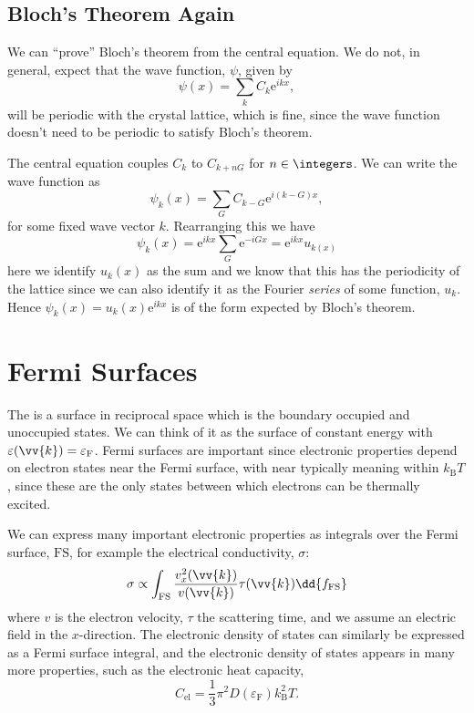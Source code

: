 \documentclass[fleqn]{NotesClass}
\newcommand*{\boltzmann}{k_{\mathrm{B}}}
\newcommand*{\e}{\mathrm{e}}
\newcommand*{\fermi}{\mathrm{F}}
\begin{document}
    \subsection{Bloch's Theorem Again}
    We can \enquote{prove} Bloch's theorem from the central equation.
    We do not, in general, expect that the wave function, \(\psi\), given by
    \begin{equation}
        \psi(x) = \sum_k C_k\e^{ikx},
    \end{equation}
    will be periodic with the crystal lattice, which is fine, since the wave function doesn't need to be periodic to satisfy Bloch's theorem.
    
    The central equation couples \(C_k\) to \(C_{k + nG}\) for \(n \in \integers\).
    We can write the wave function as
    \begin{equation}
        \psi_k(x) = \sum_G C_{k-G}\e^{i(k-G)x},
    \end{equation}
    for some fixed wave vector \(k\).
    Rearranging this we have
    \begin{equation}
        \psi_k(x) = \e^{ikx} \sum_G \e^{-i G x} = \e^{ikx}u_{k(x)}
    \end{equation}
    here we identify \(u_{k}(x)\) as the sum and we know that this has the periodicity of the lattice since we can also identify it as the Fourier \emph{series} of some function, \(u_k\).
    Hence \(\psi_k(x) = u_k(x)\e^{ikx}\) is of the form expected by Bloch's theorem.
    
    \section{Fermi Surfaces}
    The  is a surface in reciprocal space which is the boundary occupied and unoccupied states.
    We can think of it as the surface of constant energy with \(\varepsilon(\vv{k}) = \varepsilon_{\fermi}\).
    Fermi surfaces are important since electronic properties depend on electron states near the Fermi surface, with near typically meaning within \(\boltzmann T\), since these are the only states between which electrons can be thermally excited.
    
    We can express many important electronic properties as integrals over the Fermi surface, \(\mathrm{FS}\), for example the electrical conductivity, \(\sigma\):
    \begin{equation}
        \sigma \propto \int_{\mathrm{FS}} \frac{v_x^2(\vv{k})}{v(\vv{k})}\tau(\vv{k}) \dd{f_{\mathrm{FS}}}
    \end{equation}
    where \(v\) is the electron velocity, \(\tau\) the scattering time, and we assume an electric field in the \(x\)-direction.
    The electronic density of states can similarly be expressed as a Fermi surface integral, and the electronic density of states appears in many more properties, such as the electronic heat capacity,
    \begin{equation}
        C_{\mathrm{el}} = \frac{1}{3}\pi^2D(\varepsilon_{\fermi})\boltzmann^2 T.
    \end{equation}
    
\end{document}
